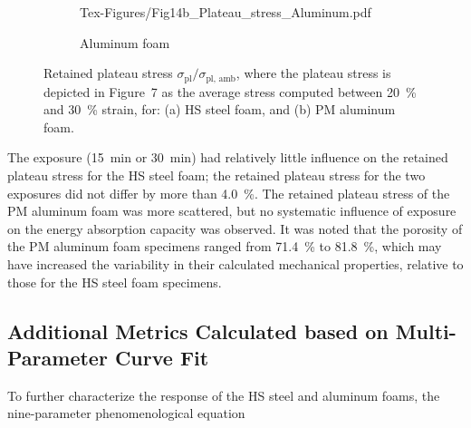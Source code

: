 \documentclass[review]{elsarticle}
\begin{document}
\begin{figure}
\begin{subfigure}{.5\textwidth}
		{Tex-Figures/Fig14b_Plateau_stress_Aluminum.pdf}
		\caption{Aluminum foam}
		\label{fig3:sub2}
	\end{subfigure}
	\caption{Retained plateau stress $\sigma_\text{pl}/\sigma_\text{pl,~amb}$, where the plateau stress is depicted in Figure~7 as the average stress computed between 20~\% and 30~\% strain, for: (a) HS steel foam, and (b) PM aluminum foam.}
	\label{Plateu_stress}
\end{figure}

The exposure (15~min or 30~min) had relatively little influence on the retained plateau stress for the HS steel foam; the retained plateau stress for the two exposures did not differ by more than 4.0~\%. The retained plateau stress of the PM aluminum foam was more scattered, but no systematic influence of exposure on the energy absorption capacity was observed. It was noted that the porosity of the PM aluminum foam specimens ranged from 71.4~\% to 81.8~\%, which may have increased the variability in their calculated mechanical properties, relative to those for the HS steel foam specimens.

\subsection{Additional Metrics Calculated based on Multi-Parameter Curve Fit}

To further characterize the response of the HS steel and aluminum foams, the nine-parameter phenomenological equation
\end{document}
